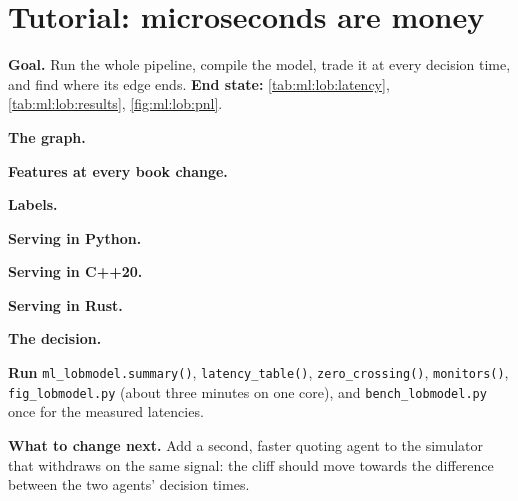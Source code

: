 \section{Tutorial: microseconds are money}\label{tut:ml:build-an-order-book-model-end-to-end:tut}

\begin{tutorial}
\textbf{Goal.} Run the whole pipeline, compile the model, trade it at every decision time, and find where its edge ends.
\textbf{End state:} \cref{tab:ml:lob:latency}, \cref{tab:ml:lob:results}, \cref{fig:ml:lob:pnl}.
\begin{tutsteps}
\item \textbf{The graph.}
\label{lst:ml:lob:graph}
\item \textbf{Features at every book change.}
\label{lst:ml:lob:onbook}
\item \textbf{Labels.}
\label{lst:ml:lob:data}
\item \textbf{Serving in Python.}
\label{lst:ml:lob:predict}
\item \textbf{Serving in C++20.}
\label{lst:ml:lob:cpp}
\item \textbf{Serving in Rust.}
\label{lst:ml:lob:rust}
\item \textbf{The decision.}
\label{lst:ml:lob:act}
\item \textbf{Run} \texttt{ml\_lobmodel.summary()}, \texttt{latency\_table()}, \texttt{zero\_crossing()}, \texttt{monitors()},
\texttt{fig\_lobmodel.py} (about three minutes on one core), and \texttt{bench\_lobmodel.py} once for the measured latencies.
\end{tutsteps}
\textbf{What to change next.} Add a second, faster quoting agent to the simulator that withdraws on the same signal: the cliff
should move towards the difference between the two agents' decision times.
\end{tutorial}

